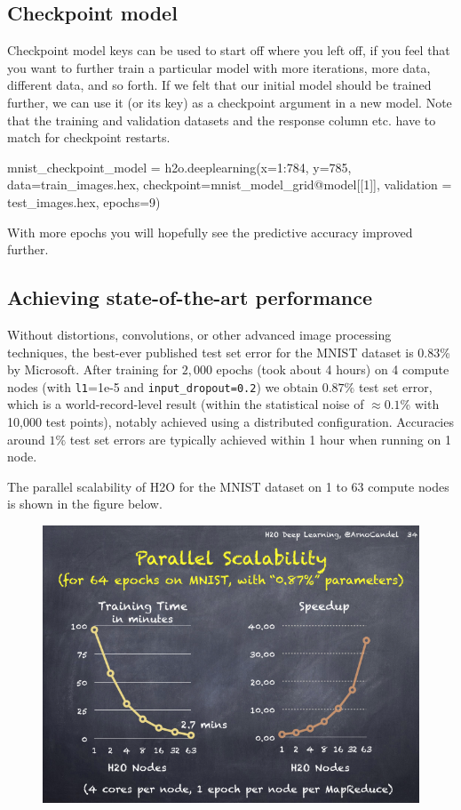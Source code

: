 \documentclass[12pt]{article}
\begin{document}
\subsection{Checkpoint model}

Checkpoint model keys can be used to start off where you left off, if you feel that you want to further train a particular model with more iterations, more data, different data, and so forth. If we felt that our initial model should be trained further, we can use it (or its key) as a checkpoint argument in a new model. Note that the training and validation datasets and the response column etc. have to match for checkpoint restarts.

\begin{spverbatim}
mnist_checkpoint_model = h2o.deeplearning(x=1:784, y=785, data=train_images.hex, checkpoint=mnist_model_grid@model[[1]], validation = test_images.hex, epochs=9)
\end{spverbatim}
\bigskip
\noindent
With more epochs you will hopefully see the predictive accuracy improved further. 

\subsection{Achieving state-of-the-art performance}

Without distortions, convolutions, or other advanced image processing techniques, the best-ever published test set error for the MNIST dataset is $0.83$\% by Microsoft. After training for $2,000$ epochs (took about 4 hours) on 4 compute nodes (with \texttt{l1}=1e-5 and \texttt{input\_dropout=0.2}) we obtain $0.87\%$ test set error, which is a world-record-level result (within the statistical noise of $\approx 0.1$\% with 10,000 test points), notably achieved using a distributed configuration. Accuracies around $1\%$ test set errors are typically achieved within 1 hour when running on 1 node.

The parallel scalability of H2O for the MNIST dataset on 1 to 63 compute nodes is shown in the figure below.
\begin{figure}[h]
\centering
\includegraphics[scale=0.5]{scalability.png}
\end{figure}
\end{document}
